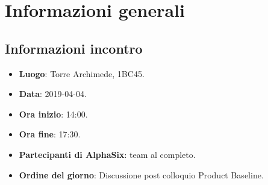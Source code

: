 \newcommand{\documento}{\VI}
\newcommand{\nomedocumentofisico}{VI\_2019-04-04.pdf}
\newcommand{\redazione}{\TG}
\newcommand{\verifica}{\SG}
\newcommand{\approvazione}{\NC}
\newcommand{\versione}{1.0.0}
\newcommand{\uso}{Interno}
\newcommand{\destinateTo}{\gruppo}
\newcommand{\datacreazione}{05 aprile 2019}
\newcommand{\datamodifica}{07 aprile 2019}
\newcommand{\stato}{Approvato}

\def\TABELLE{false}	%
\def\FIGURE{false} 	%






    

    

    \section{Informazioni generali}
		\subsection{Informazioni incontro}
			\begin{itemize}
				\item \textbf{Luogo}: Torre Archimede, 1BC45.
				\item \textbf{Data}: 2019-04-04.
				\item \textbf{Ora inizio}: 14:00.
				\item \textbf{Ora fine}: 17:30.
				\item \textbf{Partecipanti di AlphaSix}: team al completo.
				\item \textbf{Ordine del giorno}: Discussione post colloquio Product Baseline.
			\end{itemize}

